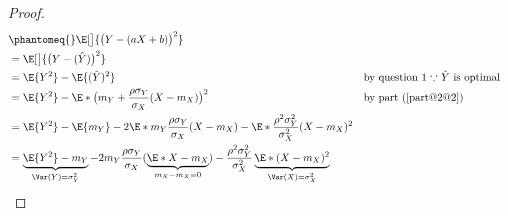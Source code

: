 \documentclass[
  coursecode={MTHE 477},
  assignmentname={Homework \homeworknumber},
  studentnumber=20053722,
  name={Bryan Hoang},
  draft,
]{
  ltxanswer%
}
\begin{document}
\begin{questions}
\begin{parts}
      \part{}
      \begin{solution}
        \begin{proof}
          \begin{align*}
             &\phantomeq{} \E[\big]{\bigl(Y - (a X + b)\bigr)^{2}}                                                                                                                                                                                                                                                                                 \\
             &= \E[\big]{\bigl(Y - (\hat{Y})\bigr)^{2}}                                                                                                                                                                                                                                                                                            \\
             &= \E{Y^{2}} - \E{(\hat{Y})^{2}}                                                                                                                                                                                                                                          & &\text{by question 1 \(\because\) \(\hat{Y}\) is optimal} \\
             &= \E{Y^{2}} - \E*{\bigl(m_{Y} + \frac{\rho \sigma_{Y}}{\sigma_{X}} (X - m_{X})\bigr)^{2}}                                                                                                                                                                                & &\text{by part~(\ref{part@2@2})}                          \\
             &= \E{Y^{2}} - \E{m_{Y}} - 2 \E*{m_{Y} \frac{\rho \sigma_{Y}}{\sigma_{X}} (X - m_{X})} - \E*{\frac{\rho^{2} \sigma_{Y}^{2}}{\sigma_{X}^{2}} (X - m_{X})^{2}}                                                                                                                                                                          \\
             &= \underbrace{\E{Y^{2}} - m_{Y}}_{\Var(Y) = \sigma_{Y}^{2}} - 2 m_{Y} \frac{\rho \sigma_{Y}}{\sigma_{X}} (\underbrace{\E*{X} - m_{X}}_{m_{X} - m_{X} = 0}) - \frac{\rho^{2} \sigma_{Y}^{2}}{\sigma_{X}^{2}} \underbrace{\E*{(X - m_{X})^{2}}}_{\Var(X) = \sigma_{X}^{2}}                                                             \\

\end{align*}
\end{proof}
\end{solution}
\end{parts}
\end{questions}
\end{document}
